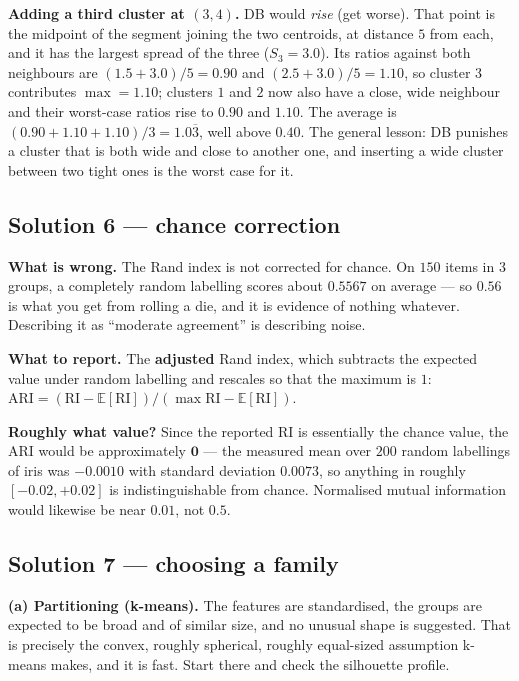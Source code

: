 \documentclass[11pt]{article}
\begin{document}
\textbf{Adding a third cluster at $(3,4)$.} DB would \emph{rise} (get worse).
That point is the midpoint of the segment joining the two centroids, at
distance $5$ from each, and it has the largest spread of the three
($S_3 = 3.0$). Its ratios against both neighbours are
$(1.5+3.0)/5 = 0.90$ and $(2.5+3.0)/5 = 1.10$, so cluster $3$ contributes
$\max = 1.10$; clusters $1$ and $2$ now also have a close, wide neighbour and
their worst-case ratios rise to $0.90$ and $1.10$. The average is
$(0.90 + 1.10 + 1.10)/3 = 1.0\overline{3}$, well above $0.40$. The general
lesson: DB punishes a cluster that is both wide and close to another one, and
inserting a wide cluster between two tight ones is the worst case for it.

\subsection*{Solution 6 --- chance correction}

\textbf{What is wrong.} The Rand index is not corrected for chance. On $150$
items in $3$ groups, a completely random labelling scores about $0.5567$ on
average --- so $0.56$ is what you get from rolling a die, and it is evidence
of nothing whatever. Describing it as ``moderate agreement'' is describing
noise.

\textbf{What to report.} The \textbf{adjusted} Rand index, which subtracts the
expected value under random labelling and rescales so that the maximum is $1$:
$\mathrm{ARI} = (\mathrm{RI} - \mathbb{E}[\mathrm{RI}]) /
(\max \mathrm{RI} - \mathbb{E}[\mathrm{RI}])$.

\textbf{Roughly what value?} Since the reported RI is essentially the chance
value, the ARI would be approximately $\mathbf{0}$ --- the measured mean over
$200$ random labellings of iris was $-0.0010$ with standard deviation
$0.0073$, so anything in roughly $[-0.02, +0.02]$ is indistinguishable from
chance. Normalised mutual information would likewise be near $0.01$, not $0.5$.

\subsection*{Solution 7 --- choosing a family}

\textbf{(a) Partitioning (k-means).} The features are standardised, the groups
are expected to be broad and of similar size, and no unusual shape is
suggested. That is precisely the convex, roughly spherical, roughly
equal-sized assumption k-means makes, and it is fast. Start there and check
the silhouette profile.
\end{document}
